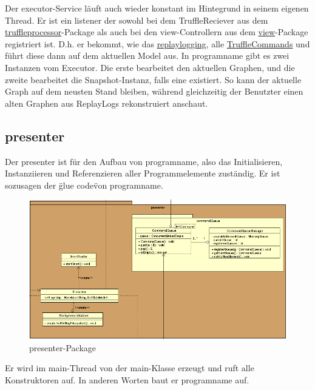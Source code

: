     Der executor-Service läuft auch wieder konstant im Hintegrund in seinem
    eigenen Thread. Er ist ein \gls{listener} der sowohl bei dem TruffleReciever aus dem
    \hyperref[subsubsec:truffleprocessor]{truffleprocessor}-Package als
    auch bei den view-Controllern aus dem \hyperref[subsec:view]{view}-Package
    registriert ist. D.h. er bekommt, wie das \hyperref[subsubsec:replaylogging]{replaylogging},
    alle \hyperref[subsubsec:trufflecommand]{TruffleCommands} und führt diese
    dann auf dem aktuellen Model aus.
    \newline
    \newline
    In \gls{programname} gibt es zwei Instanzen vom Executor. Die erste bearbeitet
    den aktuellen Graphen, und die zweite bearbeitet die Snapshot-Instanz, falls
    eine existiert. So kann der aktuelle Graph auf dem neusten Stand bleiben, während
    gleichzeitig der Benutzter einen alten Graphen aus
    ReplayLogs rekonstruiert anschaut.


\subsection{presenter}
\label{subsec:presenter}

Der presenter ist für den Aufbau von \gls{programname}, also das
Initialisieren, Instanziieren und Referenzieren aller Programmelemente zuständig.
Er ist sozusagen der \"glue code\" von \gls{programname}.

\begin{figure}[H]
  \centering
  \includegraphics[width=\textwidth]{../diagramimages/presenter.png}
  \caption{presenter-Package}
\end{figure}

Er wird im main-Thread von der main-Klasse erzeugt und ruft alle Konstruktoren auf.
In anderen Worten baut er \gls{programname} auf.

